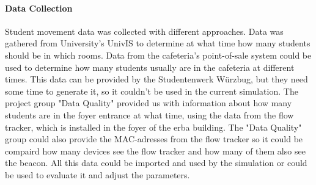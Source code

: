 \paragraph{Data Collection}
\par Student movement data was collected with different approaches. Data was gathered from University's UnivIS to determine at what time how many students should be in which rooms. Data from the cafeteria's point-of-sale system could be used to determine how many students usually are in the cafeteria at different times. This data can be provided by the Studentenwerk Würzbug, but they need some time to generate it, so it couldn't be used in the current simulation. The project group "Data Quality" provided us with information about how many students are in the foyer entrance at what time, using the data from the flow tracker, which is installed in the foyer of the erba building. The "Data Quality" group could also provide the MAC-adresses from the flow tracker so it could be compaird how many devices see the flow tracker and how many of them also see the beacon. All this data could be imported and used by the simulation or could be used to evaluate it and adjust the parameters.

